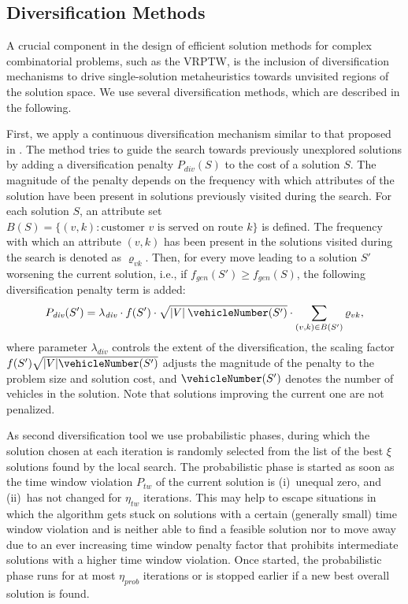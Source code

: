 \documentclass[11pt,a4paper,fleqn]{article}
\begin{document}
\subsection{Diversification Methods}
\label{sec:diversification}
A crucial component in the design of efficient solution methods for complex combinatorial problems, such as the VRPTW, is the inclusion of  diversification mechanisms to drive single-solution metaheuristics towards unvisited regions of the solution space. We use several diversification methods, which are described in the following. 

First, we apply a continuous diversification mechanism similar to that proposed in \citet{cordeau:01}. The method tries to guide the search towards previously unexplored solutions by adding a diversification penalty $P_{\mathit{div}}(S)$ to the cost of a solution $S$. The magnitude of the penalty depends on the frequency with which attributes of the solution have been present in solutions previously visited during the search. 
For each solution $S$, an attribute set $B(S) = \{(v,k)\!\!: \text{customer $v$ is served on route $k$} \}$ is defined. The frequency with which an attribute $(v,k)$ has been present in the solutions visited during the search is denoted as $\varrho_{vk}$. Then, for every move leading to a solution $S'$ worsening the current solution, i.e., if $f_{\mathit{gen}}(S') \geq f_{\mathit{gen}}(S)$,
the following diversification penalty term is added:  
\begin{equation*}
P_{\mathit{div}}(S') = \lambda_{\mathit{div}} \cdot f(S') \cdot \sqrt{|V|\:\vehicleNumber(S')} \cdot \sum_{(v,k) \in B(S')} \varrho_{vk}, 
\end{equation*}
where parameter $\lambda_{\mathit{div}}$  controls the extent of the diversification, the scaling factor $f(S') \sqrt{|V| \vehicleNumber(S')}$  adjusts the magnitude of the penalty to the problem size and solution cost, and $\vehicleNumber(S')$ denotes the number of vehicles in the solution. Note that solutions improving the current one  are not penalized.

As second diversification tool we use {probabilistic phases}, during which the solution chosen at each iteration is randomly selected from the list of the best $\xi$ solutions found by the local search. The  probabilistic phase is started as soon as the time window violation $P_{\mathit{tw}}$ of the current solution is (i)~unequal zero, and (ii)~has not changed for $\eta_{\mathit{tw}}$ iterations. This may help to escape situations in which the algorithm gets stuck on solutions with a certain (generally small) time window violation and is neither able to find a feasible solution nor to move away due to an ever increasing time window penalty factor that prohibits intermediate solutions with a higher time window violation.  Once started, the  probabilistic phase runs for at most $\eta_{\mathit{prob}}$ iterations or is stopped earlier if a new best overall solution is found. 
\end{document}
